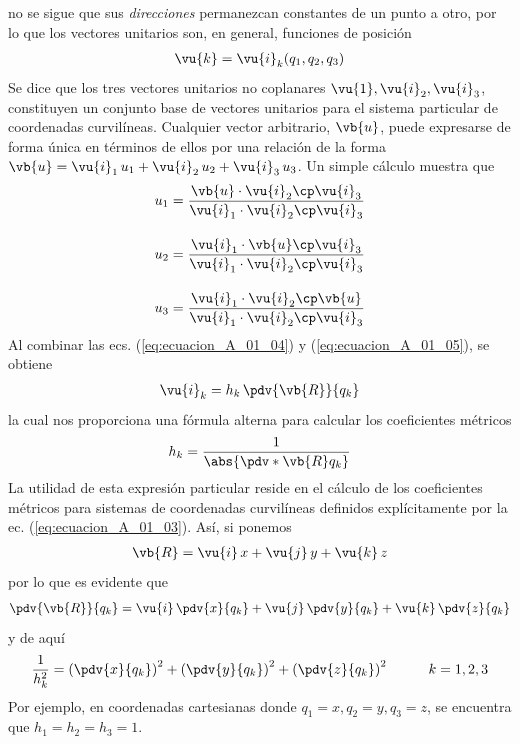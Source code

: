 no se sigue que sus \emph{direcciones} permanezcan constantes de un punto a otro, por lo que los vectores unitarios son, en general, funciones de posición
\begin{align*}
\vu{k} = \vu{i}_{k} (q_{1}, q_{2}, q_{3})
\end{align*}
Se dice que los tres vectores unitarios no coplanares $\vu{1}, \vu{i}_{2}, \vu{i}_{3}$, constituyen un conjunto base de vectores unitarios para el sistema particular de coordenadas curvilíneas. Cualquier vector arbitrario, $\vb{u}$, puede expresarse de forma única en términos de ellos por una relación de la forma $\vb{u} = \vu{i}_{1} \, u_{1} + \vu{i}_{2} \, u_{2} + \vu{i}_{3} \, u_{3}$. Un simple cálculo muestra que
\begin{align*}
u_{1} &= \dfrac{\vb{u} \cdot \vu{i}_{2} \cp \vu{i}_{3}}{\vu{i}_{1} \cdot \vu{i}_{2} \cp \vu{i}_{3}} \\[1em]
u_{2} &= \dfrac{\vu{i}_{1} \cdot \vb{u} \cp \vu{i}_{3}}{\vu{i}_{1} \cdot \vu{i}_{2} \cp \vu{i}_{3}} \\[1em]
u_{3} &= \dfrac{\vu{i}_{1} \cdot \vu{i}_{2} \cp \vb{u}}{\vu{i}_{1} \cdot \vu{i}_{2} \cp \vu{i}_{3}}
\end{align*}
Al combinar las ecs. (\ref{eq:ecuacion_A_01_04}) y (\ref{eq:ecuacion_A_01_05}), se obtiene
\begin{align}
\vu{i}_{k} = h_{k} \, \pdv{\vb{R}}{q_{k}}
\label{eq:ecuacion_A_01_07}
\end{align}
la cual nos proporciona una fórmula alterna para calcular los coeficientes métricos
\begin{align}
h_{k} = \dfrac{1}{\abs{\pdv*{\vb{R}}{q_{k}}}}
\label{eq:ecuacion_A_01_08}    
\end{align}
La utilidad de esta expresión particular reside en el cálculo de los coeficientes métricos para sistemas de coordenadas curvilíneas definidos explícitamente por la ec. (\ref{eq:ecuacion_A_01_03}). Así, si ponemos
\begin{align*}
\vb{R} = \vu{i} \, x + \vu{j} \, y + \vu{k} \, z
\end{align*}
por lo que es evidente que
\begin{align*}
\pdv{\vb{R}}{q_{k}} = \vu{i} \, \pdv{x}{q_{k}} + \vu{j} \, \pdv{y}{q_{k}} + \vu{k} \, \pdv{z}{q_{k}}
\end{align*}
y de aquí
\begin{align}
\dfrac{1}{h_{k}^{2}} = \left( \pdv{x}{q_{k}} \right)^{2} + \left( \pdv{y}{q_{k}} \right)^{2} + \left( \pdv{z}{q_{k}} \right)^{2} \hspace{1cm} k = 1, 2, 3
\label{eq:ecuacion_A_01_09}
\end{align}
Por ejemplo, en coordenadas cartesianas donde $q_{1} = x, q_{2} = y, q_{3} = z$, se encuentra que $h_{1} = h_{2} = h_{3} = 1$.

